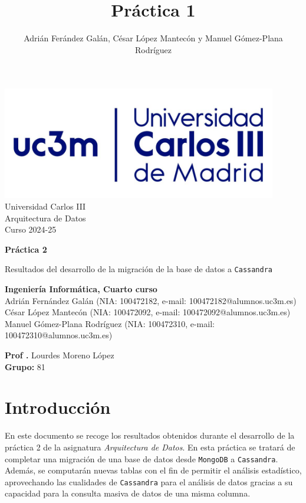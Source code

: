 \documentclass[]{article}
\title{Práctica 1}
\author{Adrián Ferández Galán, César López Mantecón y Manuel Gómez-Plana Rodríguez}
\begin{document}
\begin{titlepage}
    \centering
   \includegraphics[width=0.9\textwidth]{uc3m.jpg} 
    {\Huge Universidad Carlos III\\
    
     \Large Arquitectura de Datos\\
     \vspace{0.5cm}
     Curso 2024-25}
    \vspace{2cm}

    {\Huge \textbf{Práctica 2} \par}
    \vspace{0.5cm}
    {\Large Resultados del desarrollo de la migración de la base de datos a \texttt{Cassandra} \par}
    \vspace{8cm}

   \textbf{Ingeniería Informática, Cuarto curso}\\
    \vspace{0.2cm} 
    Adrián Fernández Galán       (NIA: 100472182, e-mail: 100472182@alumnos.uc3m.es)\\
    César López Mantecón         (NIA: 100472092, e-mail: 100472092@alumnos.uc3m.es)\\
    Manuel Gómez-Plana Rodríguez (NIA: 100472310, e-mail: 100472310@alumnos.uc3m.es)
    \vspace{0.5cm}

   
    \textbf{Prof .} Lourdes Moreno López\\
    
    \textbf{Grupo: } 81   
    
\end{titlepage}
\newpage

\renewcommand{\contentsname}{\centering Índice}

\hypersetup{linkcolor=black}
\tableofcontents
\hypersetup{linkcolor=blue}
\newpage

\section{Introducción}
\label{sec:introduccion}
En este documento se recoge los resultados obtenidos durante el desarrollo de la práctica 2 de la asignatura
\textit{Arquitectura de Datos}. En esta práctica se tratará de completar una
migración de una base de datos desde \texttt{MongoDB} a \texttt{Cassandra}.
Además, se computarán nuevas tablas con el fin de permitir el análisis
estadístico, aprovechando las cualidades de \texttt{Cassandra} para el análisis
de datos gracias a su capacidad para la consulta masiva de datos de una misma
columna.
\end{document}
